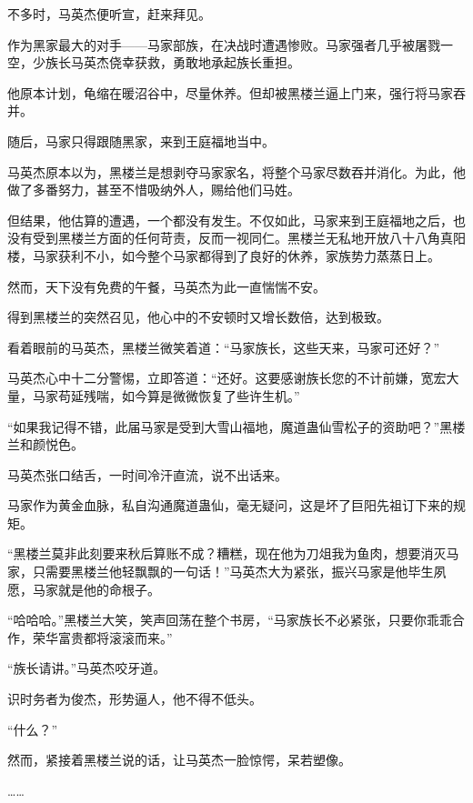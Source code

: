 
\begin{this_body}



不多时，马英杰便听宣，赶来拜见。

作为黑家最大的对手——马家部族，在决战时遭遇惨败。马家强者几乎被屠戮一空，少族长马英杰侥幸获救，勇敢地承起族长重担。

他原本计划，龟缩在暖沼谷中，尽量休养。但却被黑楼兰逼上门来，强行将马家吞并。

随后，马家只得跟随黑家，来到王庭福地当中。

马英杰原本以为，黑楼兰是想剥夺马家家名，将整个马家尽数吞并消化。为此，他做了多番努力，甚至不惜吸纳外人，赐给他们马姓。

但结果，他估算的遭遇，一个都没有发生。不仅如此，马家来到王庭福地之后，也没有受到黑楼兰方面的任何苛责，反而一视同仁。黑楼兰无私地开放八十八角真阳楼，马家获利不小，如今整个马家都得到了良好的休养，家族势力蒸蒸日上。

然而，天下没有免费的午餐，马英杰为此一直惴惴不安。

得到黑楼兰的突然召见，他心中的不安顿时又增长数倍，达到极致。

看着眼前的马英杰，黑楼兰微笑着道：“马家族长，这些天来，马家可还好？”

马英杰心中十二分警惕，立即答道：“还好。这要感谢族长您的不计前嫌，宽宏大量，马家苟延残喘，如今算是微微恢复了些许生机。”

“如果我记得不错，此届马家是受到大雪山福地，魔道蛊仙雪松子的资助吧？”黑楼兰和颜悦色。

马英杰张口结舌，一时间冷汗直流，说不出话来。

马家作为黄金血脉，私自沟通魔道蛊仙，毫无疑问，这是坏了巨阳先祖订下来的规矩。

“黑楼兰莫非此刻要来秋后算账不成？糟糕，现在他为刀俎我为鱼肉，想要消灭马家，只需要黑楼兰他轻飘飘的一句话！”马英杰大为紧张，振兴马家是他毕生夙愿，马家就是他的命根子。

“哈哈哈。”黑楼兰大笑，笑声回荡在整个书房，“马家族长不必紧张，只要你乖乖合作，荣华富贵都将滚滚而来。”

“族长请讲。”马英杰咬牙道。

识时务者为俊杰，形势逼人，他不得不低头。

“什么？”

然而，紧接着黑楼兰说的话，让马英杰一脸惊愕，呆若塑像。

……


\end{this_body}
